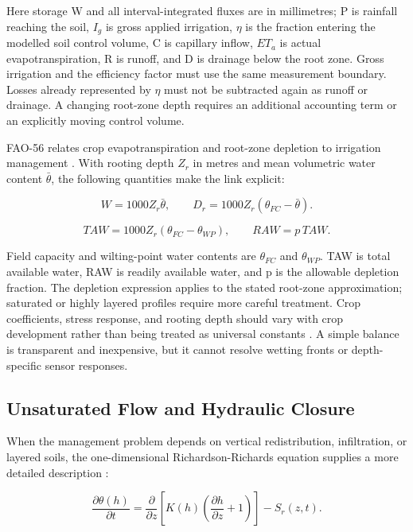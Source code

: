 \documentclass[11pt,a4paper]{article}
\begin{document}
Here storage W and all interval-integrated fluxes are in millimetres; P is rainfall reaching the soil, $I_{g}$ is gross applied irrigation, $\eta$ is the fraction entering the modelled soil control volume, C is capillary inflow, $ET_{a}$ is actual evapotranspiration, R is runoff, and D is drainage below the root zone. Gross irrigation and the efficiency factor must use the same measurement boundary. Losses already represented by $\eta$ must not be subtracted again as runoff or drainage. A changing root-zone depth requires an additional accounting term or an explicitly moving control volume.

FAO-56 relates crop evapotranspiration and root-zone depletion to irrigation management \cite{R06}. With rooting depth $Z_{r}$ in metres and mean volumetric water content $\bar\theta$, the following quantities make the link explicit:

\begin{equation}
W=1000Z_r\bar\theta,\qquad D_r=1000Z_r(\theta_{FC}-\bar\theta).
\label{eq:2}
\end{equation}

\begin{equation}
TAW=1000Z_r(\theta_{FC}-\theta_{WP}),\qquad RAW=p\,TAW.
\label{eq:3}
\end{equation}

Field capacity and wilting-point water contents are $\theta_{FC}$ and $\theta_{WP}$. TAW is total available water, RAW is readily available water, and p is the allowable depletion fraction. The depletion expression applies to the stated root-zone approximation; saturated or highly layered profiles require more careful treatment. Crop coefficients, stress response, and rooting depth should vary with crop development rather than being treated as universal constants \cite{R06}. A simple balance is transparent and inexpensive, but it cannot resolve wetting fronts or depth-specific sensor responses.

\subsection{Unsaturated Flow and Hydraulic Closure}

\label{sec:4-2}

When the management problem depends on vertical redistribution, infiltration, or layered soils, the one-dimensional Richardson-Richards equation supplies a more detailed description \cite{R07}:

\begin{equation}
\frac{\partial\theta(h)}{\partial t}=\frac{\partial}{\partial z}\left[K(h)\left(\frac{\partial h}{\partial z}+1\right)\right]-S_r(z,t).
\label{eq:4}
\end{equation}
\end{document}
